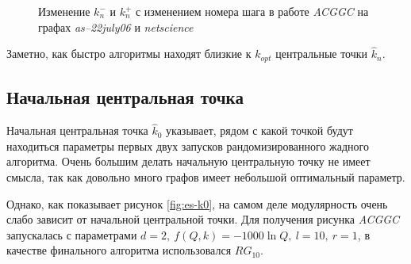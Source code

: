 \begin{figure}[H]
	\columnwidth
	\caption{Изменение $k^{-}_n$ и $k^{+}_n$ с изменением номера шага в работе \emph{ACGGC} на графах \emph{as--22july06} и \emph{netscience}}
	\label{fig:es-alpha-d3}
\end{figure}

Заметно, как быстро алгоритмы находят близкие к $k_{opt}$ центральные точки $\hat{k}_n$.



\subsection{Начальная центральная точка}

Начальная центральная точка $\hat{k}_0$ указывает, рядом с какой точкой будут находиться параметры первых двух запусков рандомизированного жадного алгоритма. Очень большим делать начальную центральную точку не имеет смысла, так как довольно много графов имеет небольшой оптимальный параметр.

Однако, как показывает рисунок \ref{fig:es-k0}, на самом деле модулярность очень слабо зависит от начальной центральной точки. Для получения рисунка \emph{ACGGC} запускалась с параметрами $d = 2,\ f(Q, k) = -1000 \ln Q,\ l = 10,\ r = 1$, в качестве финального алгоритма использовался $RG_{10}$.

